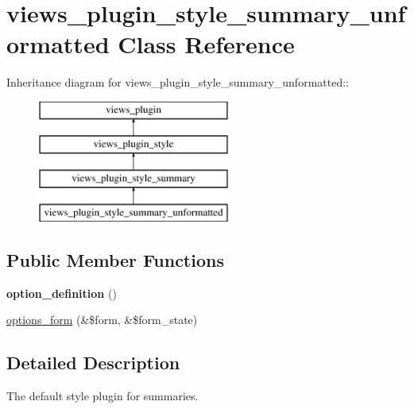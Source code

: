 \hypertarget{classviews__plugin__style__summary__unformatted}{
\section{views\_\-plugin\_\-style\_\-summary\_\-unformatted Class Reference}
\label{classviews__plugin__style__summary__unformatted}
}
Inheritance diagram for views\_\-plugin\_\-style\_\-summary\_\-unformatted::\begin{figure}[H]
\begin{center}
\leavevmode
\includegraphics[height=4cm]{classviews__plugin__style__summary__unformatted}
\end{center}
\end{figure}
\subsection*{Public Member Functions}
\begin{DoxyCompactItemize}
\item 
\hypertarget{classviews__plugin__style__summary__unformatted_a3bc8b50051e4681461dedb8099f54c24}{
{\bfseries option\_\-definition} ()}
\label{classviews__plugin__style__summary__unformatted_a3bc8b50051e4681461dedb8099f54c24}

\item 
\hyperlink{classviews__plugin__style__summary__unformatted_a8770285dac047bf88a2c77b2e798826d}{options\_\-form} (\&\$form, \&\$form\_\-state)
\end{DoxyCompactItemize}


\subsection{Detailed Description}
The default style plugin for summaries. 

